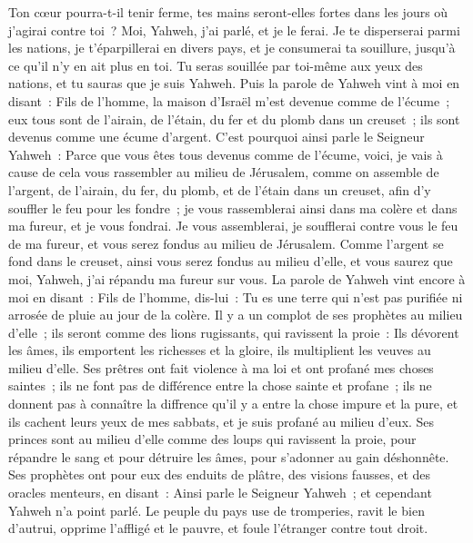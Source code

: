 \begin{multicols}{2}
Ton cœur pourra-t-il tenir ferme, tes mains seront-elles fortes dans les jours où j'agirai contre toi~? Moi, Yahweh, j'ai parlé, et je le ferai.
Je te disperserai parmi les nations, je t'éparpillerai en divers pays, et je consumerai ta souillure, jusqu'à ce qu'il n'y en ait plus en toi.
Tu seras souillée par toi-même aux yeux des nations, et tu sauras que je suis Yahweh.
Puis la parole de Yahweh vint à moi en disant~:
Fils de l'homme, la maison d'Israël m'est devenue comme de l'écume~; eux tous sont de l'airain, de l'étain, du fer et du plomb dans un creuset~; ils sont devenus comme une écume d'argent.
C'est pourquoi ainsi parle le Seigneur Yahweh~: Parce que vous êtes tous devenus comme de l'écume, voici, je vais à cause de cela vous rassembler au milieu de Jérusalem,
comme on assemble de l'argent, de l'airain, du fer, du plomb, et de l'étain dans un creuset, afin d'y souffler le feu pour les fondre~; je vous rassemblerai ainsi dans ma colère et dans ma fureur, et je vous fondrai.
Je vous assemblerai, je soufflerai contre vous le feu de ma fureur, et vous serez fondus au milieu de Jérusalem.
Comme l'argent se fond dans le creuset, ainsi vous serez fondus au milieu d'elle, et vous saurez que moi, Yahweh, j'ai répandu ma fureur sur vous.
La parole de Yahweh vint encore à moi en disant~:
Fils de l'homme, dis-lui~: Tu es une terre qui n'est pas purifiée ni arrosée de pluie au jour de la colère.
Il y a un complot de ses prophètes au milieu d'elle~; ils seront comme des lions rugissants, qui ravissent la proie~: Ils dévorent les âmes, ils emportent les richesses et la gloire, ils multiplient les veuves au milieu d'elle.
Ses prêtres ont fait violence à ma loi et ont profané mes choses saintes~; ils ne font pas de différence entre la chose sainte et profane~; ils ne donnent pas à connaître la diffrence qu'il y a entre la chose impure et la pure, et ils cachent leurs yeux de mes sabbats, et je suis profané au milieu d'eux.
Ses princes sont au milieu d'elle comme des loups qui ravissent la proie, pour répandre le sang et pour détruire les âmes, pour s'adonner au gain déshonnête.
Ses prophètes ont pour eux des enduits de plâtre, des visions fausses, et des oracles menteurs, en disant~: Ainsi parle le Seigneur Yahweh~; et cependant Yahweh n'a point parlé.
Le peuple du pays use de tromperies, ravit le bien d'autrui, opprime l'affligé et le pauvre, et foule l'étranger contre tout droit.

\end{multicols}
